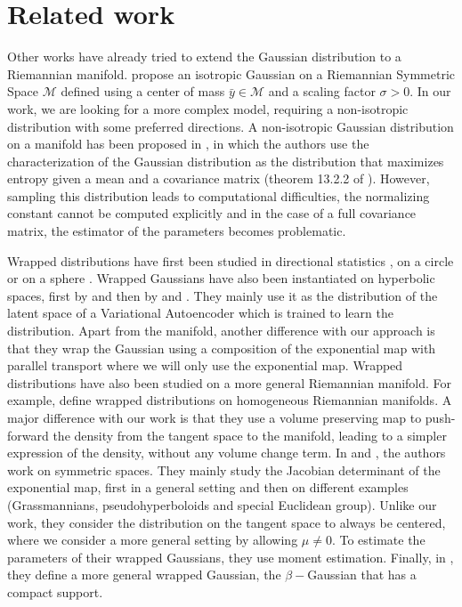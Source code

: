 \section{Related work}
Other works have already tried to extend the Gaussian distribution to a Riemannian manifold. \citet{saidGaussianDistributionsRiemannian2018} propose an isotropic Gaussian on a Riemannian Symmetric Space $\mathcal{M}$ defined using a center of mass $\bar{y} \in \mathcal{M}$ and a scaling factor $\sigma > 0$. 
In our work, we are looking for a more complex model, requiring a non-isotropic distribution with some preferred directions.  
A non-isotropic Gaussian distribution on a manifold has been proposed in \citet{pennecIntrinsicStatisticsRiemannian2006}, in which the authors use the characterization of the Gaussian distribution as the distribution that maximizes entropy given a mean and a covariance matrix (theorem 13.2.2 of \citealt{kagan1973characterization}). However, sampling this distribution leads to computational difficulties, the normalizing constant cannot be computed explicitly and in the case of a full covariance matrix, the estimator of the parameters becomes problematic.  

Wrapped distributions have first been studied in directional statistics \citep{mardiaDirectionalStatistics2000}, on a circle \citep{collettDiscriminatingMisesWrapped1981} or on a sphere \citep{haubergDirectionalStatisticsSpherical2018}. Wrapped Gaussians have also been instantiated on hyperbolic spaces, first by \citet{naganoWrappedNormalDistribution2019} and then by \citet{mathieuContinuousHierarchicalRepresentations2019} and \citet{choRotatedHyperbolicWrapped2022}. They mainly use it as the distribution of the latent space of a Variational Autoencoder \citep{Kingma2013AutoEncodingVB} which is trained to learn the distribution. Apart from the manifold, another difference with our approach is that they wrap the Gaussian using a composition of the exponential map with parallel transport where we will only use the exponential map.
Wrapped distributions have also been studied on a more general Riemannian manifold. For example, \citet{galaz-garciaWrappedDistributionsHomogeneous2022} define wrapped distributions on homogeneous Riemannian manifolds. A major difference with our work is that they use a volume preserving map to push-forward the density from the tangent space to the manifold, leading to a simpler expression of the density, without any volume change term. In \citet{chevallierExponentialWrappedDistributionsSymmetric2022} and \citet{chevallierWrappedStatisticalModels2020}, the authors work on symmetric spaces. They mainly study the Jacobian determinant of the exponential map, first in a general setting and then on different examples (Grassmannians, pseudohyperboloids and special Euclidean group). Unlike our work, they consider the distribution on the tangent space to always be centered, where we consider a more general setting by allowing $\mu \neq 0$. To estimate the parameters of their wrapped Gaussians, they use moment estimation.
Finally, in \citet{troshin2023wrapped}, they define a more general wrapped Gaussian, the $\beta-$Gaussian that has a compact support. %

